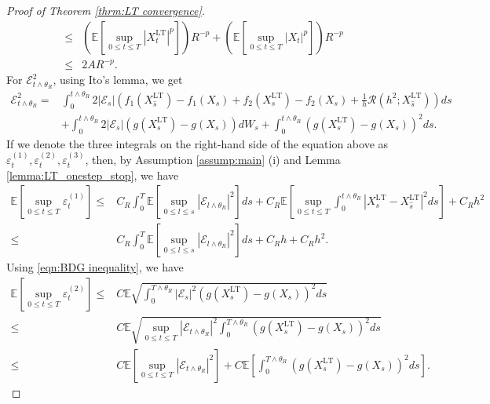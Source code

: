 \documentclass[a4paper,12pt]{article}
\numberwithin{equation}{section}
\theoremstyle{plain}
\theoremstyle{definition}
\begin{document}
\begin{appendix}
\begin{proof}[Proof of Theorem \ref{thrm:LT convergence}]
\begin{align}
    \leq&\left(\mathbb{E} \left[\sup _{0 \leq t \leq T}\left|X^{\textrm{LT}}_t\right|^p\right]\right) R^{-p}+\left(\mathbb{E} \left[\sup _{0 \leq t \leq T}\left|X_t\right|^p\right]\right) R^{-p}\nonumber\\
    \leq& 2 A R^{-p}\label{eqn:L2 decompose 1}.
\end{align}
For $\mathcal{E}_{t\wedge \theta_R}^2$, using Ito's lemma,  we get
\begin{align*}
    \mathcal{E}_{t\wedge \theta_R}^2=&\int_0^{t\wedge \theta_R}2|\mathcal{E}_s|\left(f_1(X^{\textrm{LT}}_{\hat{s}})-f_1(X_s)+f_2(X^{\textrm{LT}}_{s})-f_2(X_s)+\frac{1}{h}\mathcal{R}(h^2;X^{\textrm{LT}}_{\hat{s}})\right)ds\\
    &+\int_0^{t\wedge \theta_R}2|\mathcal{E}_s|\left(g(X^{\textrm{LT}}_{s})-g(X_s)\right)dW_s+\int_0^{t\wedge \theta_R}\left(g(X^{\textrm{LT}}_{s})-g(X_s)\right)^2 ds.
\end{align*}
If we denote the three integrals on the right-hand side of the equation above as $\varepsilon^{(1)}_t,\varepsilon^{(2)}_t,\varepsilon^{(3)}_t$, then, by Assumption \ref{assump:main} (i) and Lemma \ref{lemma:LT_onestep_stop}, we have 
\begin{align}
    \mathbb{E}\left[\sup_{0\leq t\leq T}\varepsilon^{(1)}_t\right]\leq& C_R\int_0^{T}\mathbb{E}\left[\sup_{0\leq l \leq s}\left|\mathcal{E}_{l\wedge \theta_R}\right|^2\right]ds+C_R\mathbb{E}\left[\sup_{0\leq t\leq T}\int_0^{t\wedge \theta_R}\left|X^{\textrm{LT}}_s-X^{\textrm{LT}}_{\hat{s}}\right|^2 ds\right]+C_Rh^2\nonumber\\
    \leq&C_R\int_0^{T}\mathbb{E}\left[\sup_{0\leq l \leq s}\left|\mathcal{E}_{l\wedge \theta_R}\right|^2\right]ds+C_Rh+C_Rh^2\label{eqn:varepsilon_1}.
\end{align}
Using \eqref{eqn:BDG inequality}, we have 
\begin{align}
    \mathbb{E}\left[\sup_{0\leq t\leq T}\varepsilon^{(2)}_t\right]\leq&C\mathbb{E}\sqrt{\int_0^{T\wedge \theta_R}|\mathcal{E}_s|^2\left(g(X^{\textrm{LT}}_{s})-g(X_s)\right)^2ds}\nonumber\\
    \leq & C\mathbb{E}\sqrt{\sup_{0\leq t \leq T}|\mathcal{E}_{t\wedge \theta_R}|^2\int_0^{T\wedge \theta_R}\left(g(X^{\textrm{LT}}_{s})-g(X_s)\right)^2ds}\nonumber\\
    \leq& C\mathbb{E}\left[\sup_{0\leq t\leq T}\left|\mathcal{E}_{t\wedge \theta_R}\right|^2\right]+ C\mathbb{E}\left[\int_0^{T\wedge \theta_R}\left(g(X^{\textrm{LT}}_{s})-g(X_s)\right)^2ds\right].\label{eqn:varepsilon_2}
\end{align}

\end{proof}
\end{appendix}
\end{document}
